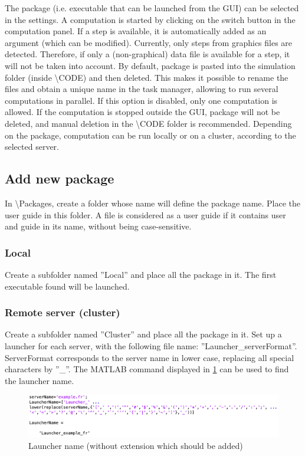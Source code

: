 \documentclass{article}
\begin{document}
The package (i.e. executable that can be launched from the GUI) can be selected in the settings. A computation is started by clicking on the switch button in the computation panel. If a step is available, it is automatically added as an argument (which can be modified). Currently, only steps from graphics files are detected. Therefore, if only a (non-graphical) data file is available for a step, it will not be taken into account. By default, package is pasted into the simulation folder (inside \textbackslash CODE) and then deleted. This makes it possible to rename the files and obtain a unique name in the task manager, allowing to run several computations in parallel. If this option is disabled, only one computation is allowed. If the computation is stopped outside the GUI, package will not be deleted, and manual deletion in the \textbackslash CODE folder is recommended. Depending on the package, computation can be run locally or on a cluster, according to the selected server.

\subsection{Add new package}

In \textbackslash Packages, create a folder whose name will define the package name. Place the user guide in this folder.  A file is considered as a user guide if it contains user and guide in its name, without being case-sensitive.

\subsubsection{Local}

Create a subfolder named ''Local'' and place all the package in it. The first executable found will be launched.

\subsubsection{Remote server (cluster)}

Create a subfolder named ''Cluster'' and place all the package in it. Set up a launcher for each server, with the following file name: ''Launcher\_serverFormat''. ServerFormat corresponds to the server name in lower case, replacing all special characters by ''\_''. The MATLAB command displayed in \cref{launcherName} can be used to find the launcher name.

\begin{figure}[H]
\centering
\includegraphics[width=\textwidth]{launcherName.png}
\caption{Launcher name (without extension which should be added)}
\label{launcherName}
\end{figure}
\end{document}
